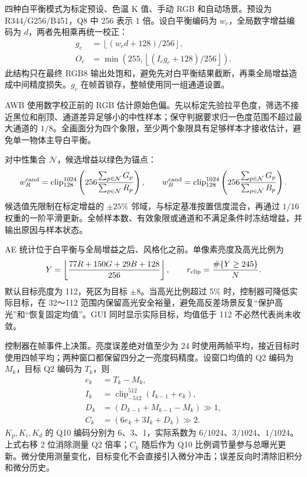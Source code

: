 四种白平衡模式为标定预设、色温 K 值、手动 RGB 和自动场景。预设为 R344/G256/B451，Q8 中 256 表示 1 倍。设白平衡编码为 $w_c$，全局数字增益编码为 $d$，两者先相乘再统一校正：
\begin{align}
g_c&=\left\lfloor(w_c d+128)/256\right\rfloor,\\
O_c&=\min\!\left(255,\left\lfloor(I_cg_c+128)/256\right\rfloor\right).
\end{align}
此结构只在最终 RGB8 输出处饱和，避免先对白平衡结果截断，再乘全局增益造成中间精度损失。$g_c$ 在帧首锁存，整帧使用同一组通道设置。

AWB 使用数字校正前的 RGB 估计原始色偏。先以标定先验拉平色度，筛选不接近黑位和削顶、通道差异足够小的中性样本；保守判据要求归一色度范围不超过最大通道的 $1/8$。全画面分为四个象限，至少两个象限具有足够样本才接收估计，避免单一物体主导白平衡。

对中性集合 $\mathcal N$，候选增益以绿色为锚点：
\begin{equation}
w_R^{\rm cand}=\operatorname{clip}_{128}^{1024}
\left(256\frac{\sum_{p\in\mathcal N}G_p}{\sum_{p\in\mathcal N}R_p}\right),\qquad
w_B^{\rm cand}=\operatorname{clip}_{128}^{1024}
\left(256\frac{\sum_{p\in\mathcal N}G_p}{\sum_{p\in\mathcal N}B_p}\right).
\end{equation}
候选值先限制在标定增益的 $\pm25\%$ 邻域，与标定基准按置信度混合，再通过 $1/16$ 权重的一阶平滑更新。全帧样本数、有效象限或通道和不满足条件时冻结增益，并输出原因与样本状态。

AE 统计位于白平衡与全局增益之后、风格化之前。单像素亮度及高光比例为
\begin{equation}
Y=\left\lfloor\frac{77R+150G+29B+128}{256}\right\rfloor,\qquad
r_{\rm clip}=\frac{\#\{Y\ge245\}}{N}.
\end{equation}
默认目标亮度为 112，死区为目标 $\pm8$。当高光比例超过 5\% 时，控制器可降低实际目标，在 32～112 范围内保留高光安全裕量，避免高反差场景反复“保护高光”和“恢复固定均值”。GUI 同时显示实际目标，均值低于 112 不必然代表尚未收敛。

控制器在帧事件上决策。亮度误差绝对值至少为 24 时使用两帧平均，接近目标时使用四帧平均；两种窗口都保留四分之一亮度码精度。设窗口均值的 Q2 编码为 $M_k$，目标 Q2 编码为 $T_k$，则
\begin{align}
e_k&=T_k-M_k,\\
I_k&=\operatorname{clip}_{-512}^{512}(I_{k-1}+e_k),\\
D_k&=(D_{k-1}+M_{k-1}-M_k)\mathbin{\gg}1,\\
C_k&=(6e_k+3I_k+D_k)\mathbin{\gg}2.
\end{align}
$K_p,K_i,K_d$ 的 Q10 编码分别为 6、3、1，实际系数为 $6/1024$、$3/1024$、$1/1024$。上式右移 2 位消除测量 Q2 倍率；$C_k$ 随后作为 Q10 比例调节量参与总曝光更新。微分使用测量变化，目标变化不会直接引入微分冲击；误差反向时清除旧积分和微分历史。

